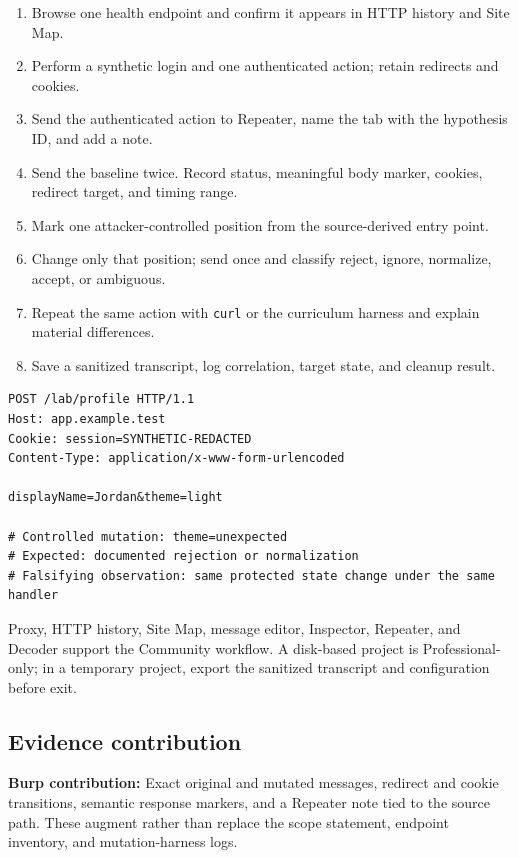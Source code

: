 \documentclass[11pt]{article}
\newcommand{\weekfield}[2]{%
  \Needspace{5\baselineskip}
  \subsection*{#1}
  #2
}
\newcommand{\burpevidence}[1]{\textbf{Burp contribution:} #1}
\begin{document}
\begin{procedurebox}
\begin{enumerate}
  \item Browse one health endpoint and confirm it appears in HTTP history and Site Map.
  \item Perform a synthetic login and one authenticated action; retain redirects and cookies.
  \item Send the authenticated action to Repeater, name the tab with the hypothesis ID, and add a note.
  \item Send the baseline twice. Record status, meaningful body marker, cookies, redirect target, and timing range.
  \item Mark one attacker-controlled position from the source-derived entry point.
  \item Change only that position; send once and classify reject, ignore, normalize, accept, or ambiguous.
  \item Repeat the same action with \texttt{curl} or the curriculum harness and explain material differences.
  \item Save a sanitized transcript, log correlation, target state, and cleanup result.
\end{enumerate}
\end{procedurebox}

\begin{lstlisting}[caption={Week 1 baseline and one-variable mutation}]
POST /lab/profile HTTP/1.1
Host: app.example.test
Cookie: session=SYNTHETIC-REDACTED
Content-Type: application/x-www-form-urlencoded

displayName=Jordan&theme=light

# Controlled mutation: theme=unexpected
# Expected: documented rejection or normalization
# Falsifying observation: same protected state change under the same handler
\end{lstlisting}

\begin{editionbox}
Proxy, HTTP history, Site Map, message editor, Inspector, Repeater, and Decoder
support the Community workflow. A disk-based project is Professional-only; in a
temporary project, export the sanitized transcript and configuration before exit.
\end{editionbox}

\weekfield{Evidence contribution}{\burpevidence{Exact original and mutated
messages, redirect and cookie transitions, semantic response markers, and a
Repeater note tied to the source path.} These augment rather than replace the
scope statement, endpoint inventory, and mutation-harness logs.}
\end{document}
